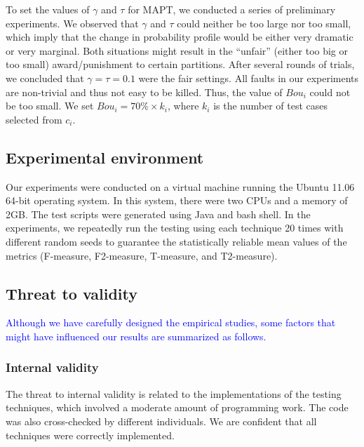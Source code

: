 \documentclass[10pt,journal,compsoc]{IEEEtran}
\begin{document}
 To set the values of $\gamma$ and $\tau$ for MAPT, we conducted a series of preliminary experiments. We observed that $\gamma$ and $\tau$ could neither be too large nor too small, which imply that the change in probability profile would be either very dramatic or very marginal. Both situations might result in the ``unfair'' (either too big or too small) award/punishment to certain partitions. After several rounds of trials, we concluded that $\gamma = \tau = 0.1$ were the fair settings. All faults in our experiments are non-trivial and thus not easy to be killed. Thus, the value of $Bou_i$ could not be too small. We set $Bou_i = 70\% \times k_i$, where $k_i$ is the number of test cases selected from $c_i$.

\subsection{Experimental environment}

Our experiments were conducted on a virtual machine running the Ubuntu 11.06 64-bit operating system. In this system, there were two CPUs and a memory of 2GB. The test scripts were generated using Java and bash shell. In the experiments, we repeatedly run the testing using each technique 20 times with different random seeds to guarantee the statistically reliable mean values of the metrics (F-measure, F2-measure, T-measure, and T2-measure).

\subsection{Threat to validity}

\textcolor{blue}{Although we have carefully designed the empirical studies, some factors that might have influenced our results are summarized as follows.}

\subsubsection{Internal validity}
The threat to internal validity is related to the implementations of the testing techniques, which involved a moderate amount of programming work. The code was also cross-checked by different individuals. We are confident that all techniques were correctly implemented.
\end{document}
